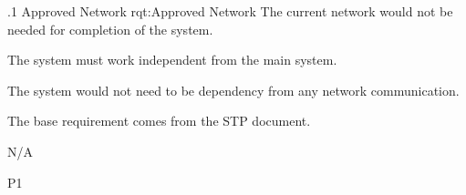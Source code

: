 \ONERQMTVKPP
{\RqtNumberBase.1}
{Approved Network}
{rqt:Approved Network}
{The current network would not be needed for completion of the system.}
{
	\item [Phase 1] The system must work independent from the main system. 
}
{ The system would not need to be dependency from any network communication.}
{
	\item [N/A] The base requirement comes from the STP document.
}
{
  \item N/A
}
{P1}



